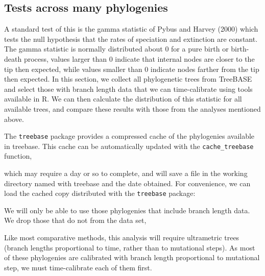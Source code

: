 \subsection{Tests across many phylogenies}

A standard test of this is the gamma statistic of Pybus and Harvey
(2000) which tests the null hypothesis that the rates of speciation and
extinction are constant. The gamma statistic is normally distributed
about 0 for a pure birth or birth-death process, values larger than 0
indicate that internal nodes are closer to the tip then expected, while
values smaller than 0 indicate nodes farther from the tip then expected.
In this section, we collect all phylogenetic trees from TreeBASE and
select those with branch length data that we can time-calibrate using
tools available in R. We can then calculate the distribution of this
statistic for all available trees, and compare these results with those
from the analyses mentioned above.

The \texttt{treebase} package provides a compressed cache of the
phylogenies available in treebase. This cache can be automatically
updated with the \texttt{cache\_treebase} function,

\begin{Shaded}
\begin{Highlighting}[]
\NormalTok{()}
\end{Highlighting}
\end{Shaded}
which may require a day or so to complete, and will save a file in the
working directory named with treebase and the date obtained. For
convenience, we can load the cached copy distributed with the
\texttt{treebase} package:

\begin{Shaded}
\begin{Highlighting}[]
\end{Highlighting}
\end{Shaded}
We will only be able to use those phylogenies that include branch length
data. We drop those that do not from the data set,

\begin{Shaded}
\begin{Highlighting}[]
\end{Highlighting}
\end{Shaded}
Like most comparative methods, this analysis will require ultrametric
trees (branch lengths proportional to time, rather than to mutational
steps). As most of these phylogenies are calibrated with branch length
proportional to mutational step, we must time-calibrate each of them
first.

